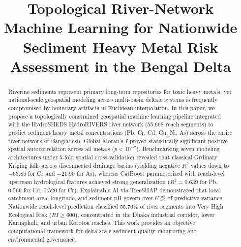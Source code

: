\documentclass[conference]{IEEEtran}
\begin{document}
\title{Topological River-Network Machine Learning for Nationwide Sediment Heavy Metal Risk Assessment in the Bengal Delta}

\author{
\and
{}
\and
{}
}

\maketitle

\begin{abstract}
Riverine sediments represent primary long-term repositories for toxic heavy metals, yet national-scale geospatial modeling across multi-basin deltaic systems is frequently compromised by boundary artifacts in Euclidean interpolation. In this paper, we propose a topologically constrained geospatial machine learning pipeline integrated with the HydroSHEDS HydroRIVERS river network (55,668 reach segments) to predict sediment heavy metal concentrations (Pb, Cr, Cd, Cu, Ni, As) across the entire river network of Bangladesh. Global Moran's $I$ proved statistically significant positive spatial autocorrelation across all metals ($p < 10^{-7}$). Benchmarking seven modeling architectures under 5-fold spatial cross-validation revealed that classical Ordinary Kriging fails across disconnected drainage basins (yielding negative $R^2$ values down to $-63.85$ for Cr and $-21.90$ for As), whereas CatBoost parameterized with reach-level upstream hydrological features achieved strong generalization ($R^2 = 0.639$ for Pb, $0.569$ for Cd, $0.520$ for Cr). Explainable AI via TreeSHAP demonstrated that local catchment area, longitude, and sediment pH govern over 65\% of predictive variance. Nationwide reach-level prediction classified 55.76\% of river segments into Very High Ecological Risk ($RI \ge 600$), concentrated in the Dhaka industrial corridor, lower Karnaphuli, and urban Korotoa reaches. This work provides an objective computational framework for delta-scale sediment quality monitoring and environmental governance.
\end{abstract}
\end{document}
